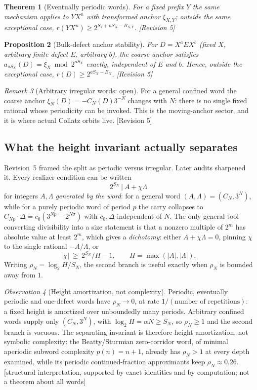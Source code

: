 \documentclass[11pt]{article}
\theoremstyle{plain}
\newtheorem{theorem}{Theorem}[section]
\newtheorem{proposition}[theorem]{Proposition}
\theoremstyle{definition}
\theoremstyle{remark}
\newtheorem{remark}[theorem]{Remark}
\newtheorem{observation}[theorem]{Observation}
\newcommand{\al}{\alpha}
\newcommand{\status}[1]{\textsf{\footnotesize[#1]}}
\begin{document}
\begin{theorem}[Eventually periodic words]\label{thm:evperiodic}
For a fixed prefix $Y$ the same mechanism applies to $YX^n$ with transformed anchor
$\xi_{X,Y}$; outside the same exceptional case, $r(YX^n)\ge2^{S_Y+nS_X-B_{X,Y}}$. \status{Revision 5}
\end{theorem}

\begin{proposition}[Bulk-defect anchor stability]\label{prop:bulkdefect}
For $D=X^aEX^b$ (fixed $X$, arbitrary finite defect $E$, arbitrary $b$), the coarse anchor satisfies
$a_{aS_X}(D)=\xi_X\bmod2^{aS_X}$ exactly, independent of $E$ and $b$. Hence, outside the
exceptional case, $r(D)\ge2^{aS_X-B_X}$. \status{Revision 5}
\end{proposition}

\begin{remark}[Arbitrary irregular words: open]\label{rem:moving}
For a general confined word the coarse anchor $\xi_N(D)=-C_N(D)3^{-N}$ changes with $N$: there is
no single fixed rational whose periodicity can be invoked. This is the moving-anchor sector, and it
is where actual Collatz orbits live. \status{Revision 5}
\end{remark}

\subsection{What the height invariant actually separates}\label{sec:height}

Revision~5 framed the split as periodic versus irregular. Later audits sharpened it. Every realizer
condition can be written
\[
2^{S_N}\ \big|\ A+\chi\Lambda
\]
for integers $A,\Lambda$ \emph{generated by the word}: for a general word $(A,\Lambda)=(C_N,3^N)$,
while for a purely periodic word of period $p$ the carry collapses to
$C_{Np}\cdot\Delta=c_0(3^{Np}-2^{N\sigma})$ with $c_0,\Delta$ independent of $N$. The only general
tool converting divisibility into a size statement is that a nonzero multiple of $2^m$ has absolute
value at least $2^m$, which gives a \emph{dichotomy}: either $A+\chi\Lambda=0$, pinning $\chi$ to
the single rational $-A/\Lambda$, or
\[
|\chi|\ \ge\ 2^{S_N}/H-1,\qquad H=\max(|A|,|\Lambda|).
\]
Writing $\rho_N=\log_2 H/S_N$, the second branch is useful exactly when $\rho_N$ is bounded away
from $1$.

\begin{observation}[Height amortization, not complexity]\label{obs:height}
Periodic, eventually periodic and one-defect words have $\rho_N\to0$, at rate $1/(\text{number of
repetitions})$: a fixed height is amortized over unboundedly many periods. Arbitrary confined words
supply only $(C_N,3^N)$, with $\log_2 H=\al N\ge S_N$, so $\rho_N\ge1$ and the second branch is
vacuous. The separating invariant is therefore height amortization, not symbolic complexity: the
Beatty/Sturmian zero-corridor word, of minimal aperiodic subword complexity $p(n)=n+1$, already has
$\rho_N>1$ at every depth examined, while its periodic continued-fraction approximants keep
$\rho_N\approx0.26$. \status{structural interpretation, supported by exact identities and by
computation; not a theorem about all words}
\end{observation}
\end{document}
